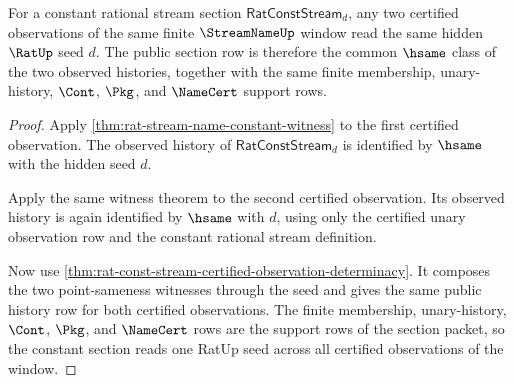 \begin{theorem}
\label{thm:streamname-finite-observation-constant-seed}
For a constant rational stream section $\mathsf{RatConstStream}_d$, any two
certified observations of the same finite $\StreamNameUp$ window read the same
hidden $\RatUp$ seed $d$. The public section row is therefore the common
$\hsame$ class of the two observed histories, together with the same finite
membership, unary-history, $\Cont$, $\Pkg$, and $\NameCert$ support rows.
\end{theorem}
\begin{proof}
Apply \autoref{thm:rat-stream-name-constant-witness} to the first certified
observation. The observed history of $\mathsf{RatConstStream}_d$ is identified
by $\hsame$ with the hidden seed $d$.

Apply the same witness theorem to the second certified observation. Its
observed history is again identified by $\hsame$ with $d$, using only the
certified unary observation row and the constant rational stream definition.

Now use
\autoref{thm:rat-const-stream-certified-observation-determinacy}. It composes
the two point-sameness witnesses through the seed and gives the same public
history row for both certified observations. The finite membership,
unary-history, $\Cont$, $\Pkg$, and $\NameCert$ rows are the support rows of
the section packet, so the constant section reads one RatUp seed across all
certified observations of the window.
\end{proof}

